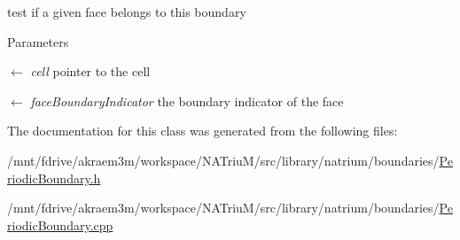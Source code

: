 test if a given face belongs to this boundary 
\begin{DoxyParams}{Parameters}
\item[\mbox{$\leftarrow$} {\em cell}]pointer to the cell \item[\mbox{$\leftarrow$} {\em faceBoundaryIndicator}]the boundary indicator of the face \end{DoxyParams}


The documentation for this class was generated from the following files:\begin{DoxyCompactItemize}
\item 
/mnt/fdrive/akraem3m/workspace/NATriuM/src/library/natrium/boundaries/\hyperlink{PeriodicBoundary_8h}{PeriodicBoundary.h}\item 
/mnt/fdrive/akraem3m/workspace/NATriuM/src/library/natrium/boundaries/\hyperlink{PeriodicBoundary_8cpp}{PeriodicBoundary.cpp}\end{DoxyCompactItemize}

